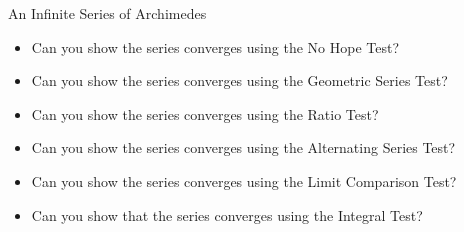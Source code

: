 \begin{exercise}{An Infinite Series of Archimedes \Coffeecup \Coffeecup \Coffeecup }
\begin{itemize}
\item Can you show the series converges using the No Hope Test?

\vspace*{.5in}

\item Can you show the series converges using the Geometric Series Test?

\vspace*{.5in}

\item Can you show the series converges using the Ratio Test?

\vspace*{.5in}

\item Can you show the series converges using the Alternating Series Test?

\vspace*{.5in}

\item Can you show the series converges using the Limit Comparison Test? 

\vspace*{.5in}

\item Can you show that the series converges using the Integral Test?

\vspace*{.5in}

\end{itemize}
\end{exercise}
